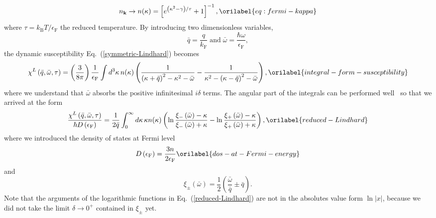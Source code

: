 \documentclass[aps,showkeys,noshowpacs,superscriptaddress,pre,preprint]{revtex4-2}
\let\label\orilabel
\begin{document}
\begin{equation}
n_\mathbf{k} \rightarrow n(\kappa) = \left[e^{\left(\kappa^2 - \gamma\right)/\tau} + 1\right]^{-1},
\label{eq:fermi-kappa}
\end{equation}
where $\tau = k_\mathrm{B} T / \epsilon_\mathrm{F}$ the reduced temperature.
By introducing two dimensionless variables,
\begin{equation*}
\bar{q} = \frac{q}{k_\mathrm{F}} \; \textrm{and} \;
\bar{\omega} = \frac{\hbar \omega}{\epsilon_\mathrm{F}} ,
\end{equation*}
the dynamic susceptibility Eq.~(\ref{symmetric-Lindhard}) becomes
\begin{equation}
\chi^L \left( \bar{q}, \bar{\omega}, \tau \right) = \left( \frac{3}{8 \pi} \right) \frac{1}{\epsilon_\mathrm{F}}
\int d^3 \kappa \, {n( \kappa )} \left(
\frac{1}{\left( \kappa + \bar{q} \right)^2 - \kappa^2 - \bar{\omega}} 
- \frac{1}{\kappa^2 - \left( \kappa - \bar{q} \right)^2 - \bar{\omega}}
\right) ,
\label{integral-form-susceptibility}
\end{equation}
where we understand that $\bar{\omega}$ absorbs the positive infinitesimal $i \delta$ terms.
The angular part of the integrals can be performed well~\cite{Fetter-Walecka1971} so that we arrived at the form
\begin{equation}
\frac{\chi^L \left( \bar{q}, \bar{\omega}, \tau \right)}{\hbar D \left( \epsilon_\mathrm{F} \right) }
= \frac{1}{2 \bar{q}} 
\int_0^\infty d \kappa \,  \kappa {n( \kappa )}  \left(
\ln \frac{{\xi_{-} \left( \bar{\omega} \right)} - \kappa}{{\xi_{-} \left( \bar{\omega} \right)} + \kappa} 
- \ln \frac{{\xi_{+} \left( \bar{\omega} \right)} - \kappa}{{\xi_{+} \left( \bar{\omega} \right)} + \kappa}
\right) ,
\label{reduced-Lindhard}
\end{equation}
where we introduced the density of states at Fermi level 
\begin{equation}
{D \left( \epsilon_\mathrm{F} \right)} = \frac{3n}{2 \epsilon_\mathrm{F}} 
\label{dos-at-Fermi-energy}
\end{equation}
and 
\begin{equation*}
\xi_\pm \left( \bar{\omega} \right) = \frac{1}{2} \left( \frac{\bar{\omega}}{\bar{q}} \pm \bar{q} \right) . 
\end{equation*}
Note that the arguments of the logarithmic functions in Eq.~(\ref{reduced-Lindhard}) 
are not in the absolutes value form $\ln \left\vert x \right\vert$,
because we did not take the limit $\delta \rightarrow 0^+$ contained in $\xi_\pm$ yet.
\end{document}
